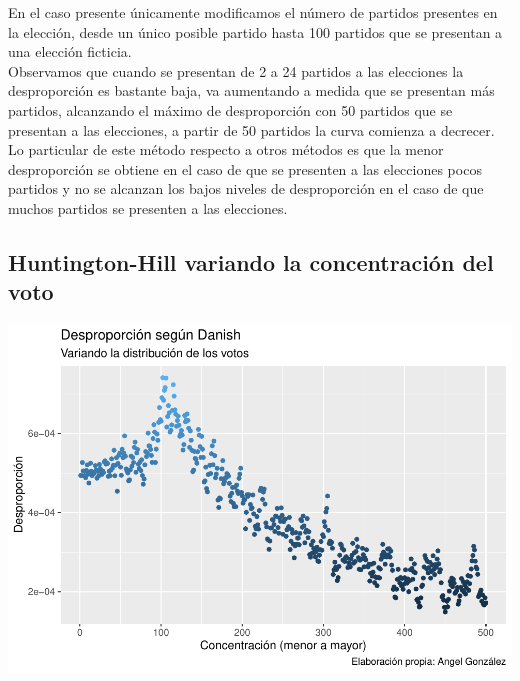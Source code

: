 \documentclass[12pt,a4paper,]{book}
\numberwithin{dummy}{section}
\theoremstyle{ocrenumbox}
\theoremstyle{blacknumex}
\theoremstyle{blacknumbox}
\theoremstyle{ocrenum}
\theoremstyle{ocrenum}
\begin{document}
En el caso presente únicamente modificamos el número de partidos
presentes en la elección, desde un único posible partido hasta 100
partidos que se presentan a una elección ficticia.\\
Observamos que cuando se presentan de 2 a 24 partidos a las elecciones
la desproporción es bastante baja, va aumentando a medida que se
presentan más partidos, alcanzando el máximo de desproporción con 50
partidos que se presentan a las elecciones, a partir de 50 partidos la
curva comienza a decrecer.\\
Lo particular de este método respecto a otros métodos es que la menor
desproporción se obtiene en el caso de que se presenten a las elecciones
pocos partidos y no se alcanzan los bajos niveles de desproporción en el
caso de que muchos partidos se presenten a las elecciones.

\hypertarget{huntington-hill-variando-la-concentraciuxf3n-del-voto}{%
\subsection{Huntington-Hill variando la concentración del
voto}\label{huntington-hill-variando-la-concentraciuxf3n-del-voto}}

\begin{center}\includegraphics[width=0.95\linewidth]{figurasR/unnamed-chunk-38-1} \end{center}
\end{document}

